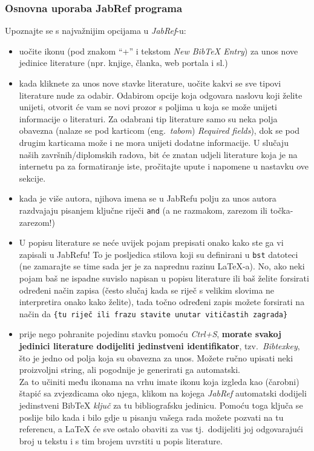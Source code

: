 \subsubsection{Osnovna uporaba JabRef programa}
Upoznajte se s najvažnijim opcijama u \emph{JabRef}-u:
\begin{itemize}
	\item uočite ikonu (pod znakom ``+'' i tekstom \emph{New BibTeX Entry}) za unos nove jedinice literature (npr. knjige, članka, web portala i sl.)
	\item kada kliknete za unos nove stavke literature, uočite kakvi se sve tipovi literature nude za odabir. Odabirom opcije koja odgovara naslovu koji želite unijeti, otvorit će vam se novi prozor s poljima u koja se može unijeti informacije o literaturi. Za odabrani tip literature samo su neka polja obavezna (nalaze se pod karticom (eng.\ \emph{tabom}) \emph{Required fields}), dok se pod drugim karticama može i ne mora unijeti dodatne informacije. U slučaju naših završnih/diplomskih radova, bit će znatan udjeli literature koja je na internetu pa za formatiranje iste, pročitajte upute i napomene u nastavku ove sekcije.
	\item kada je više autora, njihova imena se u JabRefu polju za unos autora razdvajaju pisanjem ključne riječi \verb|and| (a ne razmakom, zarezom ili točka-zarezom!)
	\item U popisu literature se neće uvijek pojam prepisati onako kako ste ga vi zapisali u JabRefu! To je posljedica stilova koji su definirani u \verb|bst| datoteci (ne zamarajte se time sada jer je za naprednu razinu \LaTeX-a). No, ako neki pojam baš ne ispadne suvislo napisan u popisu literature ili baš želite forsirati određeni način zapisa (često slučaj kada se riječ s velikim slovima ne interpretira onako kako želite), tada točno određeni zapis možete forsirati na način da \verb|{tu riječ ili frazu stavite unutar vitičastih zagrada}|
	\item prije nego pohranite pojedinu stavku pomoću \emph{Ctrl+S}, \textbf{morate svakoj jedinici literature dodijeliti jedinstveni identifikator}, tzv.\ \emph{Bibtexkey}, što je jedno od polja koja su obavezna za unos. Možete ručno upisati neki proizvoljni string, ali pogodnije je generirati ga automatski.\\ Za to učiniti među ikonama na vrhu imate ikonu koja izgleda kao (čarobni) štapić sa zvjezdicama oko njega, klikom na kojega \emph{JabRef} automatski dodijeli jedinstveni BibTeX \emph{ključ} za tu bibliografsku jedinicu. Pomoću toga ključa se poslije bilo kada i bilo gdje u pisanju vašega rada možete pozvati na tu referencu, a \LaTeX{} će sve ostalo obaviti za vas tj.\ dodijeliti joj odgovarajući broj u tekstu i s tim brojem uvrstiti u popis literature.

\end{itemize}
